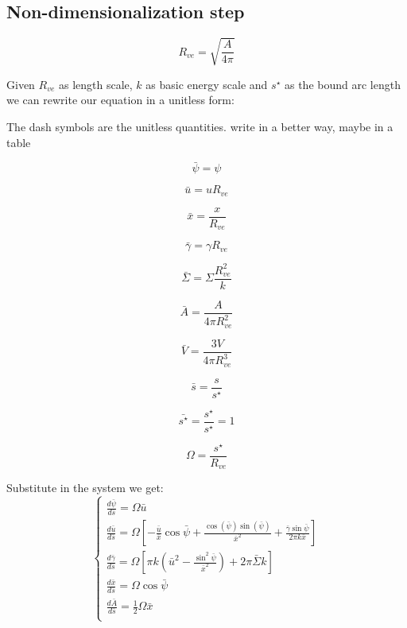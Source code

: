 \documentclass[12pt]{article}
\begin{document}
\subsection{Non-dimensionalization step}
$$
R_{ve} = \sqrt{\frac{A}{4 \pi}}
$$

Given $R_{ve}$ as length scale, $k$ as basic energy scale and $s^\star$ as the bound arc length we can rewrite our equation in a unitless form:

The dash symbols are the unitless quantities.
\alert{write in a better way, maybe in a table}


$$
\bar{\psi} = \psi
$$

$$
\bar{u} = u R_{ve}
$$

$$
\bar{x} = \frac{x}{R_{ve}}
$$

$$
\bar{\gamma} = \gamma R_{ve}
$$

$$
\bar{\Sigma} = \Sigma \frac{R_{ve}^2}{k}
$$

$$
\bar{A} = \frac{A}{4 \pi R_{ve}^2 }
$$

$$
\bar{V} = \frac{3V}{4 \pi R_{ve}^3 }
$$

$$
\bar{s} = \frac{s}{s^\star}
$$

$$
\bar{s^\star} = \frac{s^\star}{s^\star} = 1
$$

$$
\Omega = \frac{s^\star}{R_{ve}}
$$
 

Substitute in the system we get:
\begin{equation}
  \begin{cases} 
    
    \frac{d\bar{\psi}}{d\bar{s}} = \Omega \bar{u} \\[3mm]
    \frac{d\bar{u}}{d\bar{s}} = \Omega [-\frac{\bar{u}}{\bar{x}}\cos\bar{\psi}+\frac{\cos(\bar{\psi})\sin(\bar{\psi})}{\bar{x}^2}+\frac{\bar{\gamma}\sin \bar{\psi}}{2\pi k \bar{x}}] \\[3mm]
    \frac{d\bar{\gamma}}{d\bar{s}} = \Omega [\pi k (\bar{u}^2-\frac{\sin^2 \bar{\psi}}{\bar{x}^2})+2 \pi \bar{\Sigma} k] \\[3mm]
    \frac{d\bar{x}}{d\bar{s}} = \Omega \cos \bar{\psi} \\[3mm]
    \frac{d\bar{A}}{d\bar{s}} = \frac{1}{2}\Omega \bar{x} \\[3mm]
  \end{cases}
\end{equation}

\end{document}
